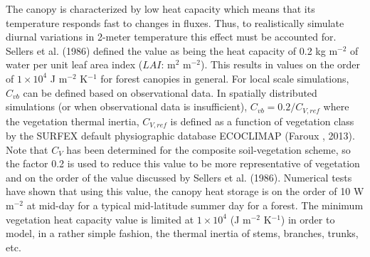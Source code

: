 %
%
%
The canopy is characterized by low heat capacity which means that its temperature responds
fast to changes in fluxes. Thus, to realistically simulate diurnal variations in 2-meter temperature
this effect must be accounted for.
Sellers et al. (1986)\nocite{Sellers86} 
defined the value as
being the heat capacity of 0.2 kg m$^{-2}$ of water per unit leaf area
index ($LAI$: m$^{2}$ m$^{-2}$). This results in values on the order of $1\times 10^{4}$ J
m$^{-2}$ K$^{-1}$ for forest canopies in general. 
%
%
For local scale simulations, $C_{vb}$ can be defined based on
observational data.
In spatially distributed simulations (or when observational data is
insufficient), $C_{vb} = 0.2/C_{V,ref}$
where the vegetation thermal
inertia, $C_{V,ref}$ is defined as a function of vegetation class by the
SURFEX default physiographic database ECOCLIMAP
(Faroux \etal, 2013)\nocite{faroux2013}. 
%
Note that $C_V$ has been determined for the composite
soil-vegetation scheme, so the factor 0.2 is used to reduce this value
to be more representative of vegetation and on the order of the
value discussed by Sellers et al. (1986)\nocite{Sellers86}.
Numerical tests have shown that using this value, the canopy
heat storage is on the order of 10 W m$^{-2}$ at mid-day for a typical
mid-latitude summer day for a forest.
%
The minimum vegetation heat capacity value is limited at
$1\times 10^{4}$ (J m$^{-2}$ K$^{-1}$)
in order to model, in a rather simple fashion, 
the thermal inertia of stems, branches, trunks, etc.
